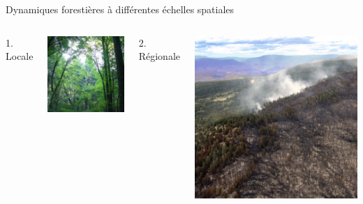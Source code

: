 \documentclass[11pt, compress, aspectratio=1610]{beamer}
\begin{document}
\begin{frame}{Dynamiques forestières à différentes échelles spatiales}
\protect\hypertarget{dynamiques-forestiuxe8res-uxe0-diffuxe9rentes-uxe9chelles-spatiales}{}

\begin{columns}[T]
  \column{6.5cm}
    1. Locale

    \centering
      \includegraphics[scale=0.338]{figures/gap}\par
  \column{6.5cm}
    2. Régionale

    \centering
      \includegraphics[scale=0.08]{figures/fire}\par
\end{columns}

\end{frame}
\end{document}
